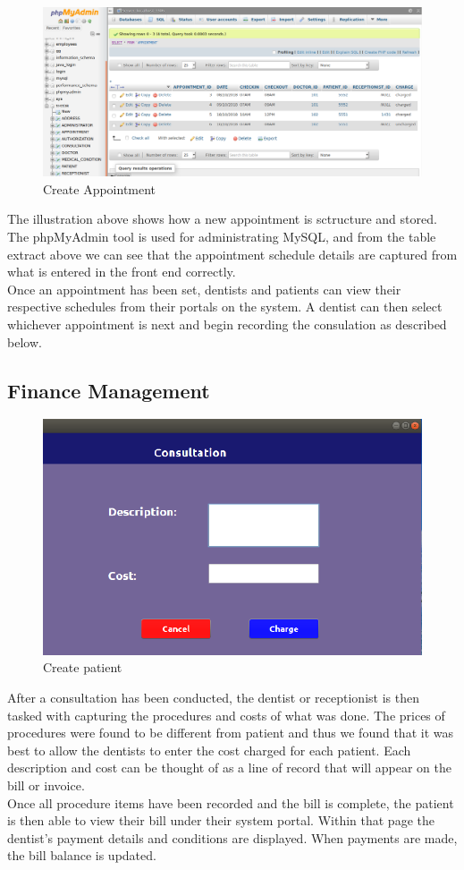 \documentclass[11 pt]{article}
\begin{document}
\begin{figure}[h]
    \centering 
    \includegraphics[width=\linewidth]{appointment_table_php.png}
    \caption{Create Appointment}
    \label{fig:Appointment}
    \end{figure}
The illustration above shows how a new appointment is sctructure and stored. The phpMyAdmin tool is used for administrating MySQL, and from the table extract above we can see that the appointment schedule details are captured from what is entered in the front end correctly.\\
Once an appointment has been set, dentists and patients can view their respective schedules from their portals on the system. A dentist can then select whichever appointment is next and begin recording the consulation as described below. \\

\subsection{Finance Management}
 \begin{figure}[h]
    \centering 
    \includegraphics[width=0.6\linewidth]{consultation.png}
    \caption{Create patient}
    \label{fig:Add consultation procedure and cost}
    \end{figure}
After a consultation has been conducted, the dentist or receptionist is then tasked with      capturing the procedures and costs of what was done. The prices of procedures were found to be different from patient and thus we found that it was best to allow the dentists to enter the cost charged for each patient. Each description and cost can be thought of as a line of record that will appear on the bill or invoice.\\
Once all procedure items have been recorded and the bill is complete, the patient is then able to view their bill under their system portal. Within that page the dentist's payment details and conditions are displayed. When payments are made, the bill balance is updated.
\newpage
\end{document}
